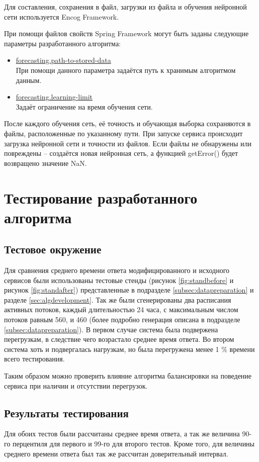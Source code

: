 \documentclass[a4paper,14pt,russian]{extreport}
\begin{document}
Для составления, сохранения в файл, загрузки из файла и обучения нейронной 
сети используется Encog Framework.

При помощи файлов свойств Spring Framework могут быть заданы следующие 
параметры разработанного алгоритма:
\begin{itemize}
	\item \url{forecasting.path-to-stored-data} \\ 
		При помощи данного параметра задаётся путь к хранимым алгоритмом 
		данным.
	\item \url{forecasting.learning-limit} \\ 
		Задаёт ограничение на время обучения сети.
\end{itemize}

После каждого обучения сеть, её точность и обучающая выборка сохраняются в 
файлы, расположенные по указанному пути. При запуске сервиса происходит 
загрузка нейронной сети и точности из файлов. Если файлы не обнаружены или 
повреждены -- создаётся новая нейронная сеть, а функцией getError() будет 
возвращено значение NaN.


\chapter{Тестирование разработанного алгоритма}
\section{Тестовое окружение}
Для сравнения среднего времени ответа модифицированного и исходного 
сервисов были использованы тестовые стенды (рисунок \ref{fig:standbefore} и 
рисунок \ref{fig:standafter}) представленные в подразделе 
\ref{subsec:datapreparation} и разделе \ref{sec:algdevelopment}. Так же были 
сгенерированы два расписания активных потоков, каждый длительностью 24 
часа, с максимальным числом потоков равным 560, и 460 (более подробно 
генерация описана в подразделе \ref{subsec:datapreparation}). В первом случае 
система была подвержена перегрузкам, в следствие чего возрастало среднее 
время ответа. Во втором система хоть и подвергалась нагрузкам, но была 
перегружена менее 1 \% времени всего тестирования.

Таким образом можно проверить влияние алгоритма балансировки на поведение 
сервиса при наличии и отсутствии перегрузок.

\section{Результаты тестирования}
Для обоих тестов были рассчитаны среднее время ответа, а так же величина 90-
го перцентиля для первого и 99-го для второго тестов. Кроме того, для величины 
среднего времени ответа был так же рассчитан доверительный интервал.
\end{document}
